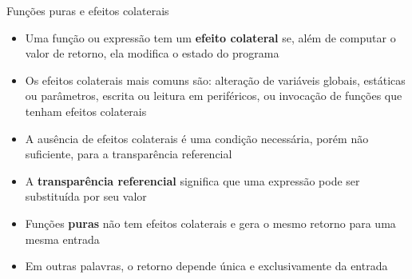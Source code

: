 \begin{frame}[fragile]{Funções puras e efeitos colaterais}

    \begin{itemize}
        \item Uma função ou expressão tem um \textbf{efeito colateral} se, além de computar o
            valor de retorno, ela modifica o estado do programa

        \item Os efeitos colaterais mais comuns são: alteração de variáveis globais, estáticas ou
            parâmetros, escrita ou leitura em periféricos, ou invocação de funções que tenham
            efeitos colaterais

        \item A ausência de efeitos colaterais é uma condição necessária, porém não suficiente,
            para a transparência referencial

        \item A \textbf{transparência referencial} significa que uma expressão pode ser substituída
            por seu valor

        \item Funções \textbf{puras} não tem efeitos colaterais e gera o mesmo retorno para uma
            mesma entrada

        \item Em outras palavras, o retorno depende única e exclusivamente da entrada
            
    \end{itemize}

\end{frame}


